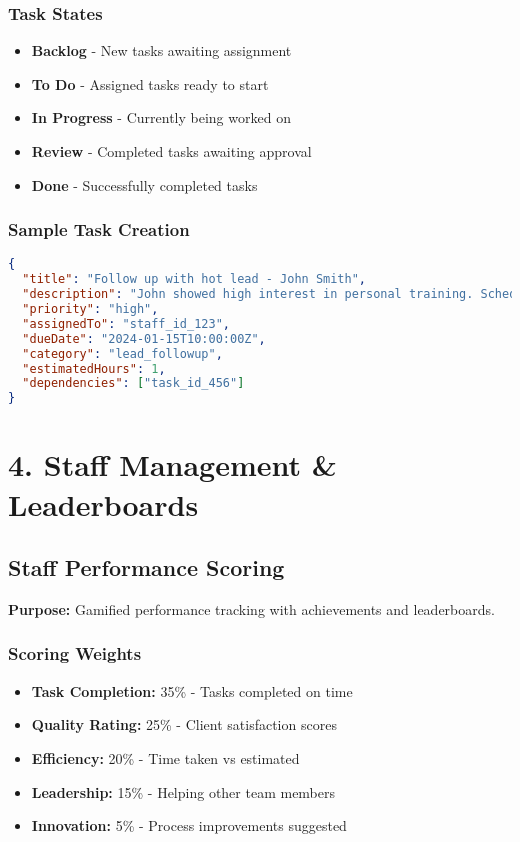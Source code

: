 \documentclass[12pt,a4paper]{article}
\newcommand{\samplecode}[1]{\begin{lstlisting}[language=JSON]#1\end{lstlisting}}
\begin{document}
\subsubsection{Task States}
\begin{itemize}
    \item \textbf{Backlog} - New tasks awaiting assignment
    \item \textbf{To Do} - Assigned tasks ready to start
    \item \textbf{In Progress} - Currently being worked on
    \item \textbf{Review} - Completed tasks awaiting approval
    \item \textbf{Done} - Successfully completed tasks
\end{itemize}

\subsubsection{Sample Task Creation}
\samplecode{
{
  "title": "Follow up with hot lead - John Smith",
  "description": "John showed high interest in personal training. Schedule consultation call.",
  "priority": "high",
  "assignedTo": "staff_id_123",
  "dueDate": "2024-01-15T10:00:00Z",
  "category": "lead_followup",
  "estimatedHours": 1,
  "dependencies": ["task_id_456"]
}
}

\section{4. Staff Management \& Leaderboards}

\subsection{Staff Performance Scoring}
\textbf{Purpose:} Gamified performance tracking with achievements and leaderboards.

\subsubsection{Scoring Weights}
\begin{itemize}
    \item \textbf{Task Completion:} 35\% - Tasks completed on time
    \item \textbf{Quality Rating:} 25\% - Client satisfaction scores
    \item \textbf{Efficiency:} 20\% - Time taken vs estimated
    \item \textbf{Leadership:} 15\% - Helping other team members
    \item \textbf{Innovation:} 5\% - Process improvements suggested
\end{itemize}
\end{document}
